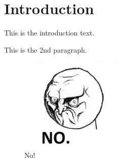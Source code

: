 \section{Introduction}

This is the introduction text.

This is the 2nd paragraph.

\begin{figure}[h]
    \centering
    \includegraphics[width=5cm]{images/no.jpg}
    \caption{No!}
\end{figure}
